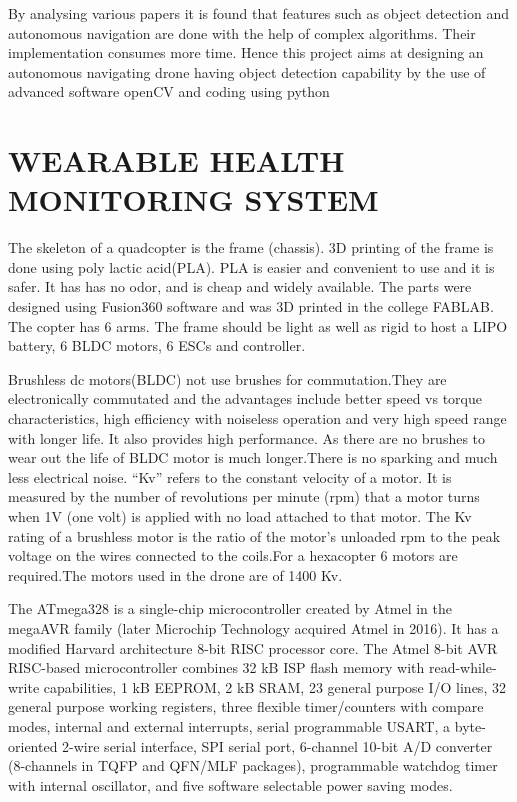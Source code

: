 \documentclass[12pt,a4paper]{report}
\begin{document}
\hspace*{1cm} By analysing various papers it is found that features such as object detection and autonomous navigation are done with the help of complex algorithms. Their implementation consumes more time.  Hence this project aims at designing an autonomous navigating drone having object detection capability by the use of advanced  software openCV and coding using python

\chapter{{WEARABLE HEALTH MONITORING SYSTEM}}

\hspace*{1cm} The skeleton of a quadcopter is the frame (chassis). 3D printing of the frame
is done using poly lactic acid(PLA). PLA is easier and convenient to use and it
is safer. It has has no odor, and is cheap and widely available. The parts were designed using Fusion360 software and was 3D printed in the college FABLAB. The copter has 6 arms. The frame should be light as well as rigid to host
a LIPO battery, 6 BLDC motors, 6 ESCs and controller. 




\hspace*{1cm} Brushless dc motors(BLDC) not use brushes for commutation.They are electronically commutated
and the advantages include better speed vs torque characteristics, high efficiency
with noiseless operation and very high speed range with longer life. It also provides high performance. As there are
no brushes to wear out the life of BLDC motor is much longer.There is no sparking and much less electrical noise. “Kv” refers to the constant velocity of a motor. It is measured by the number of revolutions per minute (rpm) that a motor turns when 1V (one volt) is applied with no load attached to that motor. The Kv rating of a brushless motor is the ratio of the motor’s unloaded rpm to the peak voltage on the wires connected to the coils.For a hexacopter 6 motors are required.The motors used in the drone are of 1400 Kv.


\hspace*{1cm}The ATmega328 is a single-chip microcontroller created by Atmel in the megaAVR family (later Microchip Technology acquired Atmel in 2016). It has a modified Harvard architecture 8-bit RISC processor core. The Atmel 8-bit AVR RISC-based microcontroller combines 32 kB ISP flash memory with read-while-write capabilities, 1 kB EEPROM, 2 kB SRAM, 23 general purpose I/O lines, 32 general purpose working registers, three flexible timer/counters with compare modes, internal and external interrupts, serial programmable USART, a byte-oriented 2-wire serial interface, SPI serial port, 6-channel 10-bit A/D converter (8-channels in TQFP and QFN/MLF packages), programmable watchdog timer with internal oscillator, and five software selectable power saving modes.
\end{document}
